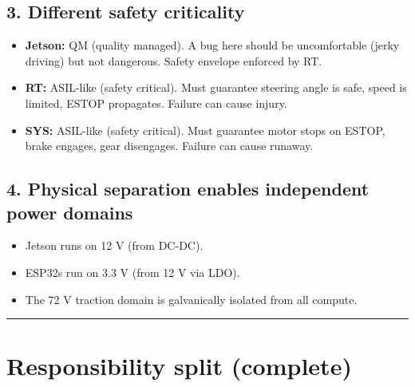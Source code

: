 \documentclass[12pt,a4paper,oneside]{report}
\providecommand{\tightlist}{\setlength{\itemsep}{0pt}\setlength{\parskip}{0pt}}
\begin{document}
\subsection{3. Different safety criticality}\label{different-safety-criticality}

\begin{itemize}
\tightlist
\item
  \textbf{Jetson:} QM (quality managed). A bug here should be uncomfortable
  (jerky driving) but not dangerous. Safety envelope enforced by RT.
\item
  \textbf{RT:} ASIL-like (safety critical). Must guarantee steering angle is
  safe, speed is limited, ESTOP propagates. Failure can cause injury.
\item
  \textbf{SYS:} ASIL-like (safety critical). Must guarantee motor stops on
  ESTOP, brake engages, gear disengages. Failure can cause runaway.
\end{itemize}

\subsection{4. Physical separation enables independent power
domains}\label{physical-separation-enables-independent-power-domains}

\begin{itemize}
\tightlist
\item
  Jetson runs on 12 V (from DC-DC).
\item
  ESP32s run on 3.3 V (from 12 V via LDO).
\item
  The 72 V traction domain is galvanically isolated from all compute.
\end{itemize}

\begin{center}\rule{0.5\linewidth}{0.5pt}\end{center}

\section{Responsibility split (complete)}\label{responsibility-split-complete}
\end{document}
